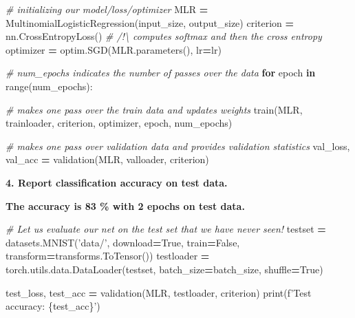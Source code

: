 \documentclass[10pt,a4paper]{article}
\newenvironment{Shaded}{\begin{snugshade}}{\end{snugshade}}
\newcommand{\BuiltInTok}[1]{#1}
\newcommand{\CommentTok}[1]{\textcolor[rgb]{0.56,0.35,0.01}{\textit{#1}}}
\newcommand{\ControlFlowTok}[1]{\textcolor[rgb]{0.13,0.29,0.53}{\textbf{#1}}}
\newcommand{\KeywordTok}[1]{\textcolor[rgb]{0.13,0.29,0.53}{\textbf{#1}}}
\newcommand{\NormalTok}[1]{#1}
\newcommand{\OperatorTok}[1]{\textcolor[rgb]{0.81,0.36,0.00}{\textbf{#1}}}
\newcommand{\SpecialCharTok}[1]{\textcolor[rgb]{0.00,0.00,0.00}{#1}}
\newcommand{\SpecialStringTok}[1]{\textcolor[rgb]{0.31,0.60,0.02}{#1}}
\newcommand{\StringTok}[1]{\textcolor[rgb]{0.31,0.60,0.02}{#1}}
\newcommand{\VariableTok}[1]{\textcolor[rgb]{0.00,0.00,0.00}{#1}}
\theoremstyle{break}
\begin{document}
\begin{Shaded}
\begin{Highlighting}[]
\CommentTok{# initializing our model/loss/optimizer}
\NormalTok{MLR }\OperatorTok{=}\NormalTok{ MultinomialLogisticRegression(input_size, output_size) }
\NormalTok{criterion }\OperatorTok{=}\NormalTok{ nn.CrossEntropyLoss() }\CommentTok{# /!\textbackslash{} computes softmax and then the cross entropy}
\NormalTok{optimizer }\OperatorTok{=}\NormalTok{ optim.SGD(MLR.parameters(), lr}\OperatorTok{=}\NormalTok{lr)}
\end{Highlighting}
\end{Shaded}

\begin{Shaded}
\begin{Highlighting}[]
\CommentTok{# num_epochs indicates the number of passes over the data}
\ControlFlowTok{for}\NormalTok{ epoch }\KeywordTok{in} \BuiltInTok{range}\NormalTok{(num_epochs):}
    
    \CommentTok{# makes one pass over the train data and updates weights}
\NormalTok{    train(MLR, trainloader, criterion, optimizer, epoch, num_epochs)}

    \CommentTok{# makes one pass over validation data and provides validation statistics}
\NormalTok{    val_loss, val_acc }\OperatorTok{=}\NormalTok{ validation(MLR, valloader, criterion)}
\end{Highlighting}
\end{Shaded}

\textbf{4. Report classification accuracy on test data.}

\textbf{\faArrowCircleRight{} The accuracy is 83 \% with 2 epochs on test data.}

\begin{Shaded}
\begin{Highlighting}[]
\CommentTok{# Let us evaluate our net on the test set that we have never seen!}
\NormalTok{testset }\OperatorTok{=}\NormalTok{ datasets.MNIST(}\StringTok{'data/'}\NormalTok{,}
\NormalTok{                         download}\OperatorTok{=}\VariableTok{True}\NormalTok{,}
\NormalTok{                         train}\OperatorTok{=}\VariableTok{False}\NormalTok{,}
\NormalTok{                         transform}\OperatorTok{=}\NormalTok{transforms.ToTensor())}
\NormalTok{testloader }\OperatorTok{=}\NormalTok{ torch.utils.data.DataLoader(testset, batch_size}\OperatorTok{=}\NormalTok{batch_size, shuffle}\OperatorTok{=}\VariableTok{True}\NormalTok{)}

\NormalTok{test_loss, test_acc }\OperatorTok{=}\NormalTok{ validation(MLR, testloader, criterion)}
\BuiltInTok{print}\NormalTok{(}\SpecialStringTok{f'Test accuracy: }\SpecialCharTok{\{}\NormalTok{test_acc}\SpecialCharTok{\}}\SpecialStringTok{'}\NormalTok{)}
\end{Highlighting}
\end{Shaded}
\end{document}
